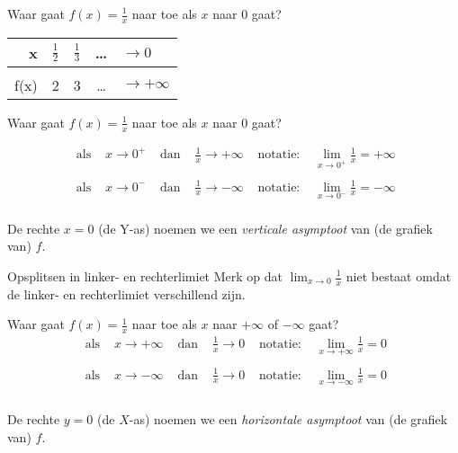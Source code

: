 \documentclass[handout]{beamer}
\begin{document}
\begin{frame}{Waar gaat $f(x)=\frac{1}{x}$ naar toe als $x$ naar $0$ gaat?}

\begin{tabular}{r|llcl}
x & $\frac{1}{2}$ & $\frac{1}{3}$ & \dots & $ \to  0$\\
\hline \\
f(x) & 2&3& \dots & $\rightarrow + \infty$
\end{tabular}
\end{frame}
\begin{frame}{Waar gaat $f(x)=\frac{1}{x}$ naar toe als $x$ naar $0$ gaat?}

\[\begin{array}{cccccc}
 \text{ als } &  x \to  0^+ & \text{ dan } & \frac1x \rightarrow + \infty &
 \text{ notatie: } & \displaystyle{\lim_{x \to  0^+} \frac1x = +
\infty} \\
 \\
 \text { als } & x \to
 0^- & \text{ dan } & \frac 1 x \rightarrow -\infty &
 \text{ notatie: } & \displaystyle{\lim_{x \to  0^-} \frac 1x = - \infty}\\
\end{array}
\]

De rechte $x = 0$ (de Y-as) noemen we een \textit{ verticale
asymptoot} van (de grafiek van) $f$.

\begin{alertblock}{Opsplitsen in linker- en rechterlimiet}
Merk op dat $\displaystyle{\lim_{x \to  0}} \frac 1x$ niet bestaat
omdat de linker- en rechterlimiet verschillend zijn.
\end{alertblock}
\end{frame}

\begin{frame}{Waar gaat $f(x)=\frac{1}{x}$ naar toe als $x$ naar $+ \infty$ of $- \infty$ gaat?}
\[\begin{array}{cccccc}
 \text{ als } &  x \rightarrow + \infty & \text{ dan } & \frac1x \rightarrow 0 &
 \text{ notatie: } & \displaystyle{\lim_{x \rightarrow + \infty} \frac1x = 0} \\
 \\
 \text { als } & x \rightarrow - \infty & \text{ dan } & \frac 1 x \rightarrow 0 &
 \text{ notatie: } & \displaystyle{\lim_{x \rightarrow - \infty} \frac 1x = 0}\\
\end{array}
\]
\\
De rechte $y=0$ (de $X$-as) noemen we een \textit{ horizontale
asymptoot} van (de grafiek van) $f$.

\end{frame}
\end{document}
